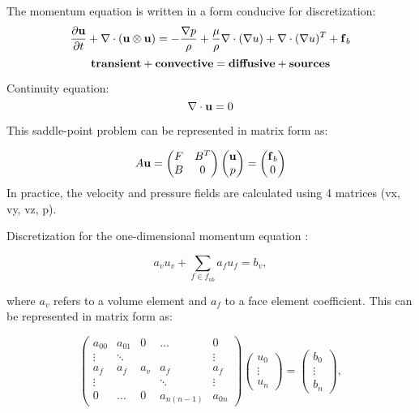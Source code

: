 \documentclass[12pt]{article}
\newcommand{\vb}[1]{\text{\textbf{#1}}}
\begin{document}
\noindent

The momentum equation is written in a form conducive for discretization:
$$
\frac{\partial \vb u}{\partial t} + \nabla \cdot (\vb u \otimes \vb u) = - \frac{\nabla p}{\rho} + \frac{\mu}{\rho} \nabla \cdot (\nabla u) + \nabla \cdot (\nabla u)^T + \vb f_b
$$
$$
\vb{transient} + \vb{convective} =  \vb{diffusive} + \vb{sources}
$$

Continuity equation:
$$
\nabla \cdot \vb u = 0
$$

This saddle-point problem can be represented in matrix form as:

$$
A \vb u = \begin{pmatrix}
  F & B^T \\
  B & 0
\end{pmatrix}
\begin{pmatrix}
  \vb u \\
  p
\end{pmatrix} =
\begin{pmatrix}
  \vb f_b \\
  0
\end{pmatrix}
$$
In practice, the velocity and pressure fields are calculated using 4 matrices (vx, vy, vz, p).

Discretization for the one-dimensional momentum equation \cite{mou}:

\begin{equation}
  a_v u_v + \sum_{f \in f_{nb}} a_f u_f = b_v,
\end{equation}

where $a_v$ refers to a volume element and $a_f$ to a face element coefficient. This can be represented in matrix form as:

$$
\begin{pmatrix}
  a_{00} & a_{01} & 0 & \dots & 0 \\
  \vdots & \ddots & &  & \vdots \\
  a_f & a_f & a_v & a_f & a_f \\
  \vdots & &  & \ddots & \vdots \\
  0 & \dots & 0 & a_{n (n - 1)} & a_{0n}
\end{pmatrix}
\begin{pmatrix}
  u_0 \\
  \vdots \\
  u_n
\end{pmatrix} =
\begin{pmatrix}
  b_{0} \\
  \vdots \\
  b_n
\end{pmatrix},
$$
\end{document}
